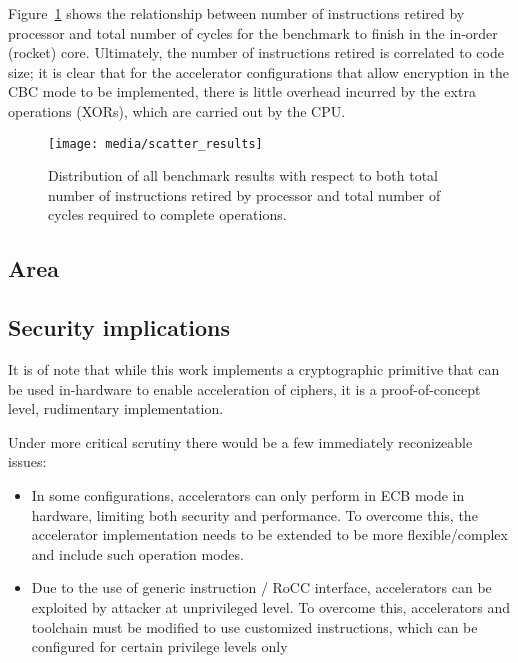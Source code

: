 \documentclass[10pt,conference]{IEEEtran}
\begin{document}

Figure~\ref{fig:scatter} shows the relationship between number of instructions
retired by processor and total number of cycles for the benchmark to finish in
the in-order (rocket) core. Ultimately, the number of instructions retired is
correlated to code size; it is clear that for the accelerator configurations
that allow encryption in the CBC mode to be implemented, there is little
overhead incurred by the extra operations (XORs), which are carried out by
the CPU.


\begin{figure}
  \centering
  \texttt{[image: media/scatter\_results]}
  \caption{Distribution of all benchmark results with respect to both total
    number of instructions retired by processor and total number of cycles
    required to complete operations.}
  \label{fig:scatter}
\end{figure}

\subsection{Area}

\subsection{Security implications}

It is of note that while this work implements a cryptographic primitive that can
be used in-hardware to enable acceleration of ciphers, it is a proof-of-concept
level, rudimentary implementation.

Under more critical scrutiny there would be a few immediately reconizeable
issues:

\begin{itemize}
  \item In some configurations, accelerators can only perform in ECB mode in
    hardware, limiting both security and performance. To overcome this, the
    accelerator implementation needs to be extended to be more flexible/complex
    and include such operation modes.
  \item Due to the use of generic instruction / RoCC interface, accelerators
    can be exploited by attacker at unprivileged level. To overcome this,
    accelerators and toolchain must be modified to use customized instructions,
    which can be configured for certain privilege levels only
\end{itemize}
\end{document}
